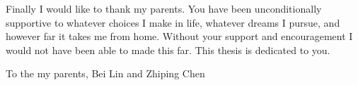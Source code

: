 Finally I would like to thank my parents. You have
been unconditionally supportive to whatever choices I make in life, whatever
dreams I pursue, and however far it takes me from home. Without your support and
encouragement I would not have been able to made this far. This thesis is
dedicated to you.

\newpage \vspace*{8cm}
\begin{center}
\large To the my parents, Bei Lin and Zhiping Chen
\end{center}
